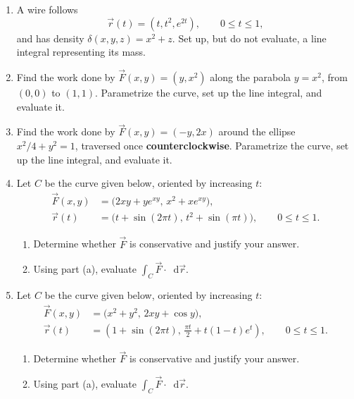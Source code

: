 \documentclass[12pt,letterpaper]{article}
\newcommand{\dd}{\mathop{}\!\mathrm{d}}
\begin{document}
\begin{enumerate}[label=\arabic*.,leftmargin=2em,labelsep=0.6em,
                  itemsep=1.1em,parsep=0pt,topsep=0pt]
\item A wire follows
\[
  \vec r(t)=(t,t^2,e^{2t}),\qquad 0\leq t\leq1,
\]
and has density $\delta(x,y,z)=x^2+z$. Set up, but do not evaluate,
a line integral representing its mass.

\item Find the work done by $\vec F(x,y)=(y,x^2)$ along the parabola
$y=x^2$, from $(0,0)$ to $(1,1)$. Parametrize the curve, set up the
line integral, and evaluate it.

\item Find the work done by $\vec F(x,y)=(-y,2x)$ around the ellipse
$x^2/4+y^2=1$, traversed once \textbf{counterclockwise}.
Parametrize the curve, set up the line integral, and evaluate it.

\item Let $C$ be the curve given below, oriented by increasing $t$:
\[
\begin{aligned}
  \vec F(x,y)&=\bigl(2xy+ye^{xy},\,x^2+xe^{xy}\bigr),\\
  \vec r(t)&=\bigl(t+\sin(2\pi t),\,t^2+\sin(\pi t)\bigr),
  \qquad 0\leq t\leq1.
\end{aligned}
\]
\begin{enumerate}[label=(\alph*),leftmargin=1.8em,topsep=0.3em,itemsep=0.2em]
  \item Determine whether $\vec F$ is conservative and justify your answer.
  \item Using part (a), evaluate $\displaystyle\int_C\vec F\cdot\dd\vec r$.
\end{enumerate}

\item Let $C$ be the curve given below, oriented by increasing $t$:
\[
\begin{aligned}
  \vec F(x,y)&=\bigl(x^2+y^2,\,2xy+\cos y\bigr),\\
  \vec r(t)&=\left(1+\sin(2\pi t),\,\frac{\pi t}{2}+t(1-t)e^t\right),
  \qquad 0\leq t\leq1.
\end{aligned}
\]
\begin{enumerate}[label=(\alph*),leftmargin=1.8em,topsep=0.3em,itemsep=0.2em]
  \item Determine whether $\vec F$ is conservative and justify your answer.
  \item Using part (a), evaluate $\displaystyle\int_C\vec F\cdot\dd\vec r$.
\end{enumerate}


\end{enumerate}
\end{document}
